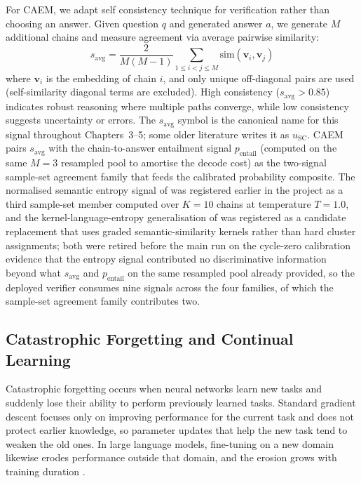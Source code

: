 For CAEM, we adapt self consistency technique for verification rather than choosing an answer. Given question $q$ and generated answer $a$, we generate $M$ additional chains and measure agreement via average pairwise similarity:
\begin{equation}
s_{\text{avg}} = \frac{2}{M(M-1)} \sum_{1 \le i < j \le M} \text{sim}(\mathbf{v}_i, \mathbf{v}_j)
\end{equation}
where $\mathbf{v}_i$ is the embedding of chain $i$, and only unique off-diagonal pairs are used (self-similarity diagonal terms are excluded). High consistency ($s_{\text{avg}} > 0.85$) indicates robust reasoning where multiple paths converge, while low consistency suggests uncertainty or errors. The $s_{\text{avg}}$ symbol is the canonical name for this signal throughout Chapters~3--5; some older literature writes it as $u_{\text{SC}}$. CAEM pairs $s_{\text{avg}}$ with the chain-to-answer entailment signal $p_{\text{entail}}$ (computed on the same $M{=}3$ resampled pool to amortise the decode cost) as the two-signal sample-set agreement family that feeds the calibrated probability composite. The normalised semantic entropy signal of \cite{farquhar2024semantic} was registered earlier in the project as a third sample-set member computed over $K{=}10$ chains at temperature $T{=}1.0$, and the kernel-language-entropy generalisation of \cite{nikitin2024kle} was registered as a candidate replacement that uses graded semantic-similarity kernels rather than hard cluster assignments; both were retired before the main run on the cycle-zero calibration evidence that the entropy signal contributed no discriminative information beyond what $s_{\text{avg}}$ and $p_{\text{entail}}$ on the same resampled pool already provided, so the deployed verifier consumes nine signals across the four families, of which the sample-set agreement family contributes two.

\subsection{Catastrophic Forgetting and Continual Learning}

Catastrophic forgetting \cite{MCCLOSKEY1989109} occurs when neural networks learn new tasks and suddenly lose their ability to perform previously learned tasks. Standard gradient descent focuses only on improving performance for the current task and does not protect earlier knowledge, so parameter updates that help the new task tend to weaken the old ones. In large language models, fine-tuning on a new domain likewise erodes performance outside that domain, and the erosion grows with training duration \cite{biderman2024lora}.

